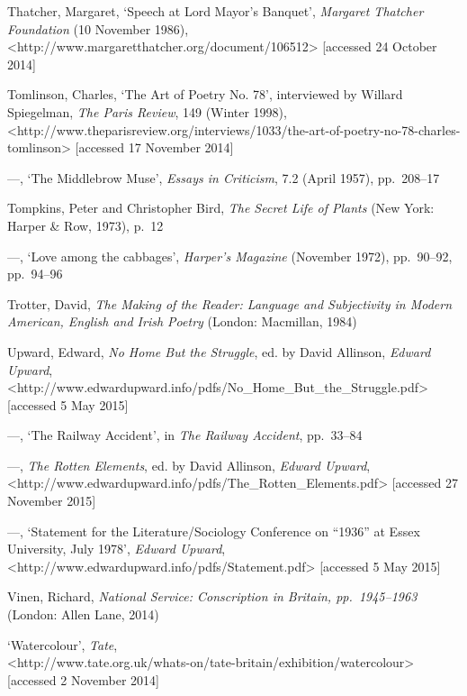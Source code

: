 \documentclass[]{article}
\begin{document}
Thatcher, Margaret, `Speech at Lord Mayor's Banquet', \emph{Margaret
Thatcher Foundation} (10 November 1986),\\
\textless{}http://www.margaretthatcher.org/document/106512\textgreater{}
{[}accessed 24 October 2014{]}

Tomlinson, Charles, `The Art of Poetry No. 78', interviewed by Willard
Spiegelman, \emph{The Paris Review}, 149 (Winter 1998),\\
\textless{}http://www.theparisreview.org/interviews/1033/the-art-of-poetry-no-78-charles-tomlinson\textgreater{}
{[}accessed 17 November 2014{]}

---, `The Middlebrow Muse', \emph{Essays in Criticism}, 7.2 (April
1957), pp.~208--17

Tompkins, Peter and Christopher Bird, \emph{The Secret Life of Plants}
(New York: Harper \& Row, 1973), p.~12

---, `Love among the cabbages', \emph{Harper's Magazine} (November
1972), pp.~90--92, pp.~94--96

Trotter, David, \emph{The Making of the Reader: Language and
Subjectivity in Modern American, English and Irish Poetry} (London:
Macmillan, 1984)

Upward, Edward, \emph{No Home But the Struggle}, ed. by David Allinson,
\emph{Edward Upward},\\
\textless{}http://www.edwardupward.info/pdfs/No\_Home\_But\_the\_Struggle.pdf\textgreater{}
{[}accessed 5 May 2015{]}

---, `The Railway Accident', in \emph{The Railway Accident}, pp.~33--84

---, \emph{The Rotten Elements}, ed. by David Allinson, \emph{Edward
Upward},\\
\textless{}http://www.edwardupward.info/pdfs/The\_Rotten\_Elements.pdf\textgreater{}
{[}accessed 27 November 2015{]}

---, `Statement for the Literature/Sociology Conference on ``1936'' at
Essex University, July 1978', \emph{Edward Upward},\\
\textless{}http://www.edwardupward.info/pdfs/Statement.pdf\textgreater{}
{[}accessed 5 May 2015{]}

Vinen, Richard, \emph{National Service: Conscription in Britain,
pp.~1945--1963} (London: Allen Lane, 2014)

`Watercolour', \emph{Tate},\\
\textless{}http://www.tate.org.uk/whats-on/tate-britain/exhibition/watercolour\textgreater{}
{[}accessed 2 November 2014{]}
\end{document}
